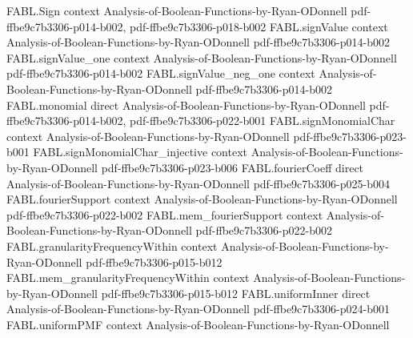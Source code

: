 \begin{theorem}
\label{FABL.productTotalInfluence_biased_eq_sigma_sq_mul_expect_sensitivity}
\leanok
{}
\proofstep
  {FABL.Sign}
  {context}
  {Analysis-of-Boolean-Functions-by-Ryan-ODonnell}
  {pdf-ffbe9c7b3306-p014-b002,
    pdf-ffbe9c7b3306-p018-b002}
\proofstep
  {FABL.signValue}
  {context}
  {Analysis-of-Boolean-Functions-by-Ryan-ODonnell}
  {pdf-ffbe9c7b3306-p014-b002}
\proofstep
  {FABL.signValue_one}
  {context}
  {Analysis-of-Boolean-Functions-by-Ryan-ODonnell}
  {pdf-ffbe9c7b3306-p014-b002}
\proofstep
  {FABL.signValue_neg_one}
  {context}
  {Analysis-of-Boolean-Functions-by-Ryan-ODonnell}
  {pdf-ffbe9c7b3306-p014-b002}
\proofstep
  {FABL.monomial}
  {direct}
  {Analysis-of-Boolean-Functions-by-Ryan-ODonnell}
  {pdf-ffbe9c7b3306-p014-b002,
    pdf-ffbe9c7b3306-p022-b001}
\proofstep
  {FABL.signMonomialChar}
  {context}
  {Analysis-of-Boolean-Functions-by-Ryan-ODonnell}
  {pdf-ffbe9c7b3306-p023-b001}
\proofstep
  {FABL.signMonomialChar_injective}
  {context}
  {Analysis-of-Boolean-Functions-by-Ryan-ODonnell}
  {pdf-ffbe9c7b3306-p023-b006}
\proofstep
  {FABL.fourierCoeff}
  {direct}
  {Analysis-of-Boolean-Functions-by-Ryan-ODonnell}
  {pdf-ffbe9c7b3306-p025-b004}
\proofstep
  {FABL.fourierSupport}
  {context}
  {Analysis-of-Boolean-Functions-by-Ryan-ODonnell}
  {pdf-ffbe9c7b3306-p022-b002}
\proofstep
  {FABL.mem_fourierSupport}
  {context}
  {Analysis-of-Boolean-Functions-by-Ryan-ODonnell}
  {pdf-ffbe9c7b3306-p022-b002}
\proofstep
  {FABL.granularityFrequencyWithin}
  {context}
  {Analysis-of-Boolean-Functions-by-Ryan-ODonnell}
  {pdf-ffbe9c7b3306-p015-b012}
\proofstep
  {FABL.mem_granularityFrequencyWithin}
  {context}
  {Analysis-of-Boolean-Functions-by-Ryan-ODonnell}
  {pdf-ffbe9c7b3306-p015-b012}
\proofstep
  {FABL.uniformInner}
  {direct}
  {Analysis-of-Boolean-Functions-by-Ryan-ODonnell}
  {pdf-ffbe9c7b3306-p024-b001}
\proofstep
  {FABL.uniformPMF}
  {context}
  {Analysis-of-Boolean-Functions-by-Ryan-ODonnell}

\end{theorem}
